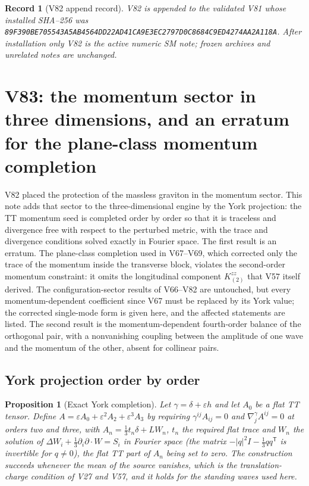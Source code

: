 \documentclass[11pt]{article}
\newtheorem{proposition}[theorem]{Proposition}
\newtheorem{record}[theorem]{Record}
\theoremstyle{remark}
\begin{document}
\begin{record}[V82 append record]
\label{rec:v19v82}
V82 is appended to the validated V81 whose installed SHA--256 was
\texttt{89F390BE705543A5AB4564DD22AD41CA9E3EC2797D0C8684C9ED4274AA2A118A}.
After installation only V82 is the active numeric SM note; frozen
archives and unrelated notes are unchanged.
\end{record}


\section{V83: the momentum sector in three dimensions, and an erratum for the plane-class momentum completion}
\label{sec:v19v83}

V82 placed the protection of the massless graviton in the momentum
sector.  This note adds that sector to the three-dimensional engine by
the York projection: the TT momentum seed is completed order by order
so that it is traceless and divergence free with respect to the
perturbed metric, with the trace and divergence conditions solved
exactly in Fourier space.  The first result is an erratum.  The
plane-class completion used in V67--V69, which corrected only the
trace of the momentum inside the transverse block, violates the
second-order momentum constraint: it omits the longitudinal component
\(K^{zz}_{(2)}\) that V57 itself derived.  The configuration-sector
results of V66--V82 are untouched, but every momentum-dependent
coefficient since V67 must be replaced by its York value; the corrected
single-mode form is given here, and the affected statements are
listed.  The second result is the momentum-dependent fourth-order
balance of the orthogonal pair, with a nonvanishing coupling between
the amplitude of one wave and the momentum of the other, absent for
collinear pairs.

\subsection{York projection order by order}

\begin{proposition}[Exact York completion]
\label{prop:v19v83-york}
Let \(\gamma=\delta+\varepsilon h\) and let \(A_0\) be a flat TT tensor.
Define \(A=\varepsilon A_0+\varepsilon^2A_2+\varepsilon^3A_3\) by requiring
\(\gamma^{ij}A_{ij}=0\) and \(\nabla^\gamma_jA^{ij}=0\) at orders two and
three, with \(A_n=\tfrac13t_n\delta+L W_n\), \(t_n\) the required flat
trace and \(W_n\) the solution of
\(\Delta W_i+\tfrac13\partial_i\partial\cdot W=S_i\) in Fourier space
(the matrix \(-|q|^2I-\tfrac13qq^{\mathsf T}\) is invertible for
\(q\neq0\)), the flat TT part of \(A_n\) being set to zero.  The
construction succeeds whenever the mean of the source vanishes, which
is the translation-charge condition of V27 and V57, and it holds for
the standing waves used here.
\end{proposition}
\end{document}
